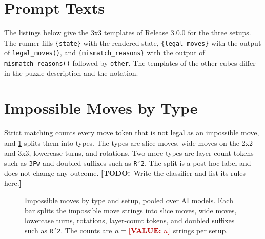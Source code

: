 \documentclass[10pt,twocolumn,letterpaper]{article}
\newcommand{\todo}[1]{{\color{red!70!black}\textbf{[TODO:}~#1\textbf{]}}}
\newcommand{\val}[1]{{\color{red!70!black}\textbf{[VALUE:}~#1\textbf{]}}}
\newcommand{\code}[1]{\texttt{#1}}
\begin{document}
\clearpage



\appendix
\section{Prompt Texts}\label{app:prompts}
The listings below give the 3x3 templates of Release 3.0.0 for the three setups. The runner fills \code{\{state\}} with the rendered state, \code{\{legal\_moves\}} with the output of \code{legal\_moves()}, and \code{\{mismatch\_reasons\}} with the output of \code{mismatch\_reasons()} followed by \code{other}. The templates of the other cubes differ in the puzzle description and the notation.




\section{Impossible Moves by Type}\label{app:taxonomy}
Strict matching counts every move token that is not legal as an impossible move, and \cref{fig:taxonomy} splits them into types. The types are slice moves, wide moves on the 2x2 and 3x3, lowercase turns, and rotations. Two more types are layer-count tokens such as \code{3Fw} and doubled suffixes such as \code{R'2}. The split is a post-hoc label and does not change any outcome. \todo{Write the classifier and list its rules here.}

\begin{figure}[t]
\caption{Impossible moves by type and setup, pooled over AI models. Each bar splits the impossible move strings into slice moves, wide moves, lowercase turns, rotations, layer-count tokens, and doubled suffixes such as \code{R'2}. The counts are $n = \val{n}$ strings per setup.}
\label{fig:taxonomy}
\end{figure}
\end{document}
